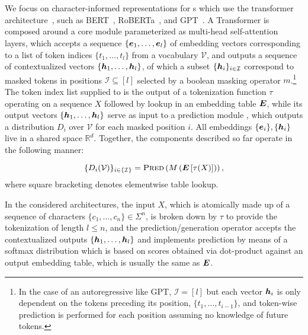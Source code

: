 \section{\tokdetok}
\label{sec:model}

We focus on character-informed representations for \llm{}s which use the transformer architecture~\cite{vaswani2017attention}, such as BERT~\cite{devlin-etal-2019-bert}, RoBERTa~\cite{liu2019roberta}, 
and GPT~\cite{radford2018improving}.
A Transformer \llm{} is composed around a core module \mmod{} parameterized as multi-head self-attention layers, which accepts a sequence $\{\bm{e}_1, \dots, \bm{e}_l\}$ of embedding vectors corresponding to a list of token indices $\{t_1, \dots, t_l\}$ from a vocabulary $\mathcal{V}$,
and outputs a sequence of contextualized vectors $\{\bm{h}_1, \dots, \bm{h}_l\}$, of which a subset $\{\bm{h}_i\}_{i\in\mathcal{I}}$ correspond to masked tokens in positions $\mathcal{I}\subseteq [l]$ selected by a boolean masking operator $m$.\footnote{In the case of an autoregressive \llm{} like GPT, $\mathcal{I} = [l]$ but each vector $\bm{h}_i$ is only dependent on the tokens preceding its position, $\{t_1, \dots, t_{i-1}\}$, and token-wise prediction is performed for each position assuming no knowledge of future tokens.}
The token index list supplied to \mmod{} is the output of a tokenization function $\tau$ operating on a sequence $X$ followed by lookup in an embedding table $\bm{E}$,
while its output vectors $\{\bm{h}_1, \dots, \bm{h}_l\}$ serve as input to a prediction module \gen{}, which outputs a distribution $D_i$ over $\mathcal{V}$ for each masked position $i$.
All embeddings $\{\bm{e}_i\},\{\bm{h}_i\}$ live in a shared space $\mathds{R}^d$.
Together, the components described so far operate in the following manner:

\begin{equation}
    \{D_i(\mathcal{V})\}_{i\in\{\mathcal{I}\}} = 
    \text{\textsc{Pred}{}}\left( \text{\textsc{$M$}{}} \left( \bm{E}\left[ \tau(X) \right] \right) \right),
\end{equation}
where square bracketing denotes elementwise table lookup.

In the considered \llm{} architectures, the input $X$, which is atomically made up of a sequence of characters $\{c_1, \dots, c_n\}\in\Sigma^{n}$, is broken down by $\tau$ to provide the tokenization of length $l\leq n$,
and the prediction/generation operator \gen{} accepts the contextualized outputs $\{\bm{h}_1, \dots, \bm{h}_l\}$ and implements prediction by means of a softmax distribution which is based on scores obtained via dot-product against an output embedding table, which is usually the same as $\bm{E}$.


